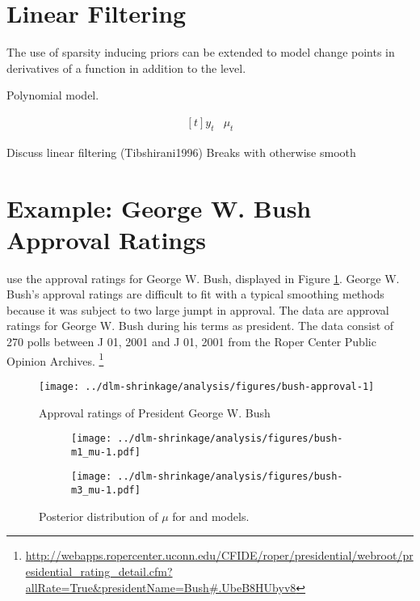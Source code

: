 \section{Linear Filtering}
\label{dlm:sec:linear-filtering}


The use of sparsity inducing priors can be extended to model change points in derivatives of a function in addition to the level.

Polynomial model.

\begin{equation}
  \label{dlm:eq:24}
  \begin{aligned}[t]
    y_{t} & \mu_{t}
  \end{aligned}
\end{equation}

Discuss linear filtering (Tibshirani1996)
Breaks with otherwise smooth 


\section{Example: George W. Bush Approval Ratings}
\label{dlm:sec:george-w.-bush}

\textcite{RatkovicEng2010} use the approval ratings for George W. Bush, displayed in Figure \ref{dlm:fig:bush_approval}.
George W. Bush's approval ratings are difficult to fit with a typical smoothing methods because it was subject to two large jumpt in approval.
The data are approval ratings for George W. Bush during his terms as president.
The data consist of 270 polls between J 01, 2001 and J 01, 2001 from the Roper Center Public Opinion Archives.%
\footnote{\url{http://webapps.ropercenter.uconn.edu/CFIDE/roper/presidential/webroot/presidential_rating_detail.cfm?allRate=True\&presidentName=Bush\#.UbeB8HUbyv8}}


\begin{figure}[thbp!]
  \centering
  \texttt{[image: ../dlm-shrinkage/analysis/figures/bush-approval-1]}
  \caption{Approval ratings of President George W. Bush}
  \label{dlm:fig:bush_approval}
\end{figure}

\begin{figure}[thbp!]
  \centering
  \begin{subfigure}[b]{\linewidth}
    \texttt{[image: ../dlm-shrinkage/analysis/figures/bush-m1\_mu-1.pdf]}
    \caption{}
  \end{subfigure}

  \begin{subfigure}[b]{\linewidth}
    \texttt{[image: ../dlm-shrinkage/analysis/figures/bush-m3\_mu-1.pdf]}
    \caption{}
  \end{subfigure}
  \caption{Posterior distribution of $\mu$ for  and  models.}
  \label{dlm:fig:bush_mu}
\end{figure}


